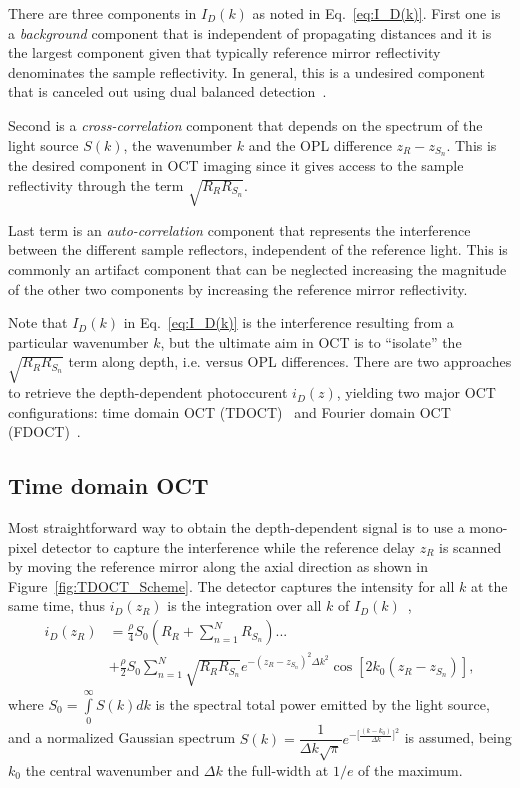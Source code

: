 There are three components in $I_D(k)$ as noted in Eq.~\eqref{eq:I_D(k)}. First one is a \textit{background} component that is independent of propagating distances and it is the largest component given that typically reference mirror reflectivity denominates the sample reflectivity. In general, this is a undesired component that is canceled out using dual balanced detection~\cite{Podoleanu2000_Unbalanced}.

Second is a \textit{cross-correlation} component that depends on the spectrum of the light source $S(k)$, the wavenumber $k$ and the OPL difference $z_R-z_{S_n}$. This is the desired component in OCT imaging since it gives access to the sample reflectivity through the term $\sqrt{R_RR_{S_n}}$.

Last term is an \textit{auto-correlation} component that represents the interference between the different sample reflectors, independent of the reference light. This is commonly an artifact component that can be neglected increasing the magnitude of the other two components by increasing the reference mirror reflectivity.

Note that $I_D(k)$ in Eq.~\eqref{eq:I_D(k)} is the interference resulting from a particular wavenumber $k$, but the ultimate aim in OCT is to ``isolate'' the $\sqrt{R_RR_{S_n}}$ term along depth, i.e. versus OPL differences. There are two approaches to retrieve the depth-dependent photoccurent $i_D(z)$, yielding two major OCT configurations: time domain OCT (TDOCT)~\cite{Huang1991_Optical} and Fourier domain OCT (FDOCT)~\cite{Fercher1995_Measurement}.

\subsection{Time domain OCT}

Most straightforward way to obtain the depth-dependent signal is to use a mono-pixel detector to capture the interference while the reference delay $z_R$ is scanned by moving the reference mirror along the axial direction as shown in Figure~\ref{fig:TDOCT_Scheme}. The detector captures the intensity for all $k$ at the same time, thus $i_D(z_R)$ is the integration over all $k$ of $I_D(k)$~\cite{Izatt2015_Theory},
\begin{align}
    i_D(z_R) &= \frac{\rho}{4}S_0\left(R_R+\sum_{n=1}^N R_{S_n}\right)... \nonumber \\
    &+ \frac{\rho}{2}S_0 \sum_{n=1}^N \sqrt{R_RR_{S_n}} e^{-\left(z_R-z_{S_n}\right)^2 \Delta k^2}\cos\left[2k_0\left(z_R-z_{S_n}\right)\right],
\end{align}
where $S_0 = \int\limits_{0}^\infty S(k)dk$ is the spectral total power emitted by the light source, and a normalized Gaussian spectrum $S(k) =\dfrac{1}{\Delta k\sqrt{\pi}}e^{-\big[\frac{(k-k_0)}{\Delta k}\big]^2}$ is assumed, being $k_0$ the central wavenumber and $\Delta k$ the full-width at $1/e$ of the maximum.

